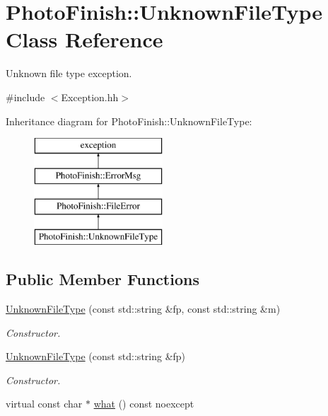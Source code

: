 \hypertarget{class_photo_finish_1_1_unknown_file_type}{}\section{Photo\+Finish\+:\+:Unknown\+File\+Type Class Reference}
\label{class_photo_finish_1_1_unknown_file_type}


Unknown file type exception.  




{\ttfamily \#include $<$Exception.\+hh$>$}

Inheritance diagram for Photo\+Finish\+:\+:Unknown\+File\+Type\+:\begin{figure}[H]
\begin{center}
\leavevmode
\includegraphics[height=4.000000cm]{class_photo_finish_1_1_unknown_file_type}
\end{center}
\end{figure}
\subsection*{Public Member Functions}
\begin{DoxyCompactItemize}
\item 
\hyperlink{class_photo_finish_1_1_unknown_file_type_a271518b1c9fbaa399d2edb8e2f3e302f}{Unknown\+File\+Type} (const std\+::string \&fp, const std\+::string \&m)
\begin{DoxyCompactList}\small\item\em Constructor. \end{DoxyCompactList}\item 
\hyperlink{class_photo_finish_1_1_unknown_file_type_af84baca5311597b5ed513a732e7499f1}{Unknown\+File\+Type} (const std\+::string \&fp)
\begin{DoxyCompactList}\small\item\em Constructor. \end{DoxyCompactList}\item 
virtual const char $\ast$ \hyperlink{class_photo_finish_1_1_unknown_file_type_a756a01080a750ff0c5bb6fa81e9a6b2a}{what} () const noexcept
\end{DoxyCompactItemize}
